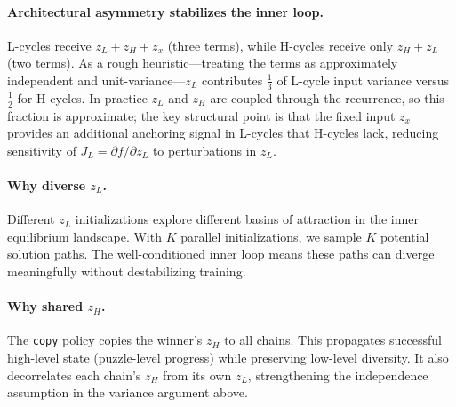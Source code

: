 \paragraph{Architectural asymmetry stabilizes the inner loop.} L-cycles receive
$z_L + z_H + z_x$ (three terms), while H-cycles receive only
$z_H + z_L$ (two terms). As a rough heuristic---treating the terms as
approximately independent and unit-variance---$z_L$ contributes
$\tfrac{1}{3}$ of L-cycle input variance versus $\tfrac{1}{2}$ for H-cycles.
In practice $z_L$ and $z_H$ are coupled through the recurrence, so this
fraction is approximate; the key structural point is that the fixed input
$z_x$ provides an additional anchoring signal in L-cycles that H-cycles lack,
reducing sensitivity of $J_L = \partial f / \partial z_L$ to perturbations
in $z_L$.

\paragraph{Why diverse $z_L$.} Different $z_L$ initializations explore
different basins of attraction in the inner equilibrium landscape. With $K$
parallel initializations, we sample $K$ potential solution paths. The
well-conditioned inner loop means these paths can diverge meaningfully without
destabilizing training.

\paragraph{Why shared $z_H$.} The \texttt{copy} policy copies the
winner's $z_H$ to all chains. This propagates successful high-level state
(puzzle-level progress) while preserving low-level diversity. It also
decorrelates each chain's $z_H$ from its own $z_L$, strengthening the
independence assumption in the variance argument above.
